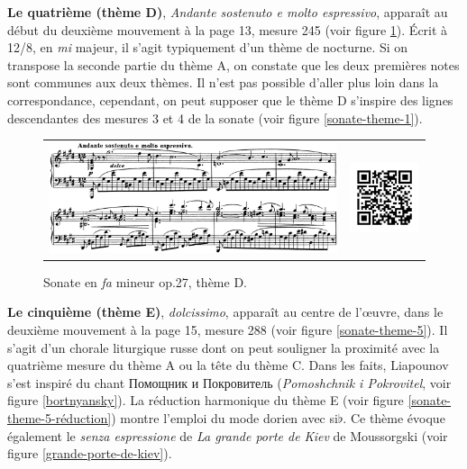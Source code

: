 \textbf{Le quatrième (thème D)}, \emph{Andante sostenuto e molto espressivo}, apparaît au début du deuxième mouvement à la page 13, mesure 245 (voir figure \ref{sonate-theme-4}). Écrit à 12/8, en \emph{mi} majeur, il s'agit typiquement d'un thème de nocturne. Si on transpose la seconde partie du thème A, on constate que les deux premières notes sont communes aux deux thèmes. Il n'est pas possible d'aller plus loin dans la correspondance, cependant, on peut supposer que le thème D s'inspire des lignes descendantes des mesures 3 et 4 de la sonate (voir figure \ref{sonate-theme-1}).

\begin{figure}[!ht]
  \begin{bigcenter}
    \begin{tabular}{lr}
      \includegraphics[width=12.5cm, keepaspectratio]{sonate-theme-D.png}
      &
      \includegraphics[width=3cm, keepaspectratio]{op1-qr.png}
    \end{tabular}
  \end{bigcenter}
  \caption{\label{sonate-theme-4}Sonate en \emph{fa} mineur op.27, thème D.}
\end{figure}

\textbf{Le cinquième (thème E)}, \emph{dolcissimo},  apparaît au centre de l'œuvre, dans le deuxième mouvement à la page 15, mesure 288 (voir figure \ref{sonate-theme-5}). Il s'agit d'un chorale liturgique russe dont on peut souligner la proximité avec la quatrième mesure du thème A ou la tête du thème C. Dans les faits, Liapounov s'est inspiré du chant \foreignlanguage{russian}{Помощник и Покровитель} (\emph{Pomoshchnik i Pokrovitel}, voir figure \ref{bortnyansky}). La réduction harmonique du thème E (voir figure \ref{sonate-theme-5-réduction}) montre l'emploi du mode dorien avec si$\flat$. Ce thème évoque également le \emph{senza espressione} de \emph{La grande porte de Kiev} de Moussorgski (voir figure \ref{grande-porte-de-kiev}).\\

